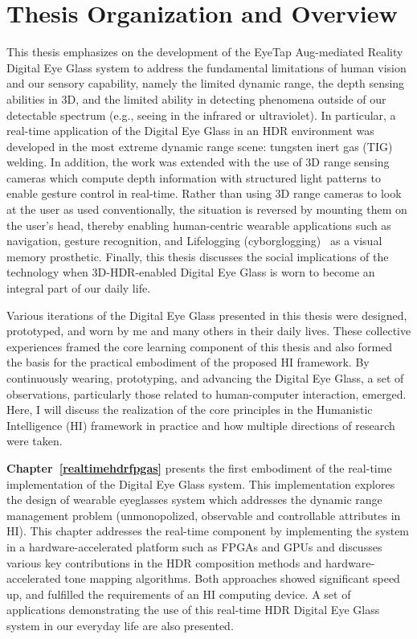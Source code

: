 \section{Thesis Organization and Overview}
This thesis emphasizes on the development of the EyeTap Aug-mediated Reality Digital Eye Glass 
system to address the fundamental limitations of human vision and our sensory capability, namely the 
limited dynamic range, the depth sensing abilities in 3D, and the limited ability in detecting 
phenomena outside of our detectable spectrum (e.g., seeing in the infrared or ultraviolet). In particular, 
a real-time application of the Digital Eye Glass in an HDR environment was developed in the most 
extreme dynamic range scene: tungsten inert gas (TIG) welding.  In addition, the work was extended 
with the use of 3D range sensing cameras which compute depth information with structured light 
patterns to enable gesture control in real-time.  Rather than using 3D range cameras to look at the 
user as used conventionally, the situation is reversed by mounting them on the user's head, thereby 
enabling human-centric wearable applications such as navigation, gesture recognition, and 
Lifelogging (cyborglogging)~\cite{mann2006cyborglogging,benedikt2015dagstuhl, billinghurst2015augmenting,gurrin2014lifelogging} as a visual memory prosthetic. Finally, this thesis discusses the social implications of the technology when 
3D-HDR-enabled Digital Eye Glass is worn to become an integral part of our daily life.

Various iterations of the Digital Eye Glass presented in this thesis were designed, prototyped, and 
worn by me and many others in their daily lives. These collective experiences framed the core 
learning component of this thesis and also formed the basis for the practical embodiment of the 
proposed HI framework. By continuously wearing, prototyping, and advancing the Digital Eye Glass, a 
set of observations, particularly those related to human-computer interaction, emerged. Here, I will 
discuss the realization of the core principles in the Humanistic Intelligence (HI) framework in practice 
and how multiple directions of research were taken. 


\textbf{Chapter~\ref{realtimehdrfpgas}} presents the first embodiment of the real-time implementation 
of the Digital Eye Glass system. This implementation explores the design of wearable eyeglasses 
system which addresses the dynamic range management problem (unmonopolized, observable and 
controllable attributes in HI). This chapter addresses the real-time component by implementing the 
system in a hardware-accelerated platform such as FPGAs and GPUs and discusses various key 
contributions in the HDR composition methods and hardware-accelerated tone mapping algorithms. 
Both approaches showed significant speed up, and fulfilled the requirements of an HI computing 
device. A set of applications demonstrating the use of this real-time HDR Digital Eye Glass system in 
our everyday life are also presented.
 

